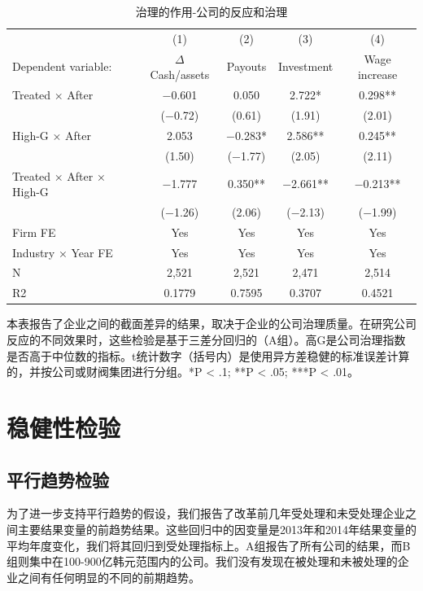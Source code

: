 \documentclass{article}
\begin{document}
\begin{table}[H]
\caption{治理的作用-公司的反应和治理}
\centering
\begin{tabular}{lcccc}
\toprule
                           & (1)          & (2)     & (3)        & (4)           \\ 
Dependent   variable:      & $\Delta$ Cash/assets & Payouts & Investment & Wage increase \\ \midrule
Treated ×   After          & −0.601       & 0.050   & 2.722*     & 0.298**       \\
                           & (−0.72)      & (0.61)  & (1.91)     & (2.01)        \\
High-G ×   After           & 2.053        & −0.283* & 2.586**    & 0.245**       \\
                           & (1.50)       & (−1.77) & (2.05)     & (2.11)        \\
Treated ×   After × High-G & −1.777       & 0.350** & −2.661**   & −0.213**      \\
                           & (−1.26)      & (2.06)  & (−2.13)    & (−1.99)       \\
Firm FE                    & Yes      & Yes  & Yes  & Yes      \\
Industry ×   Year FE       & Yes     &  Yes    & Yes      &  Yes         \\
N                          & 2,521        & 2,521   & 2,471      & 2,514         \\
R2                         & 0.1779       & 0.7595  & 0.3707     & 0.4521        \\ \bottomrule
\end{tabular}
\begin{tablenotes}
\footnotesize
    \item 本表报告了企业之间的截面差异的结果，取决于企业的公司治理质量。在研究公司反应的不同效果时，这些检验是基于三差分回归的（A组）。高G是公司治理指数是否高于中位数的指标。t统计数字（括号内）是使用异方差稳健的标准误差计算的，并按公司或财阀集团进行分组。*P < .1; **P < .05; ***P < .01。
\end{tablenotes}
\end{table}


\section{稳健性检验}
\subsection{平行趋势检验}
为了进一步支持平行趋势的假设，我们报告了改革前几年受处理和未受处理企业之间主要结果变量的前趋势结果。这些回归中的因变量是2013年和2014年结果变量的平均年度变化，我们将其回归到受处理指标上。A组报告了所有公司的结果，而B组则集中在100-900亿韩元范围内的公司。我们没有发现在被处理和未被处理的企业之间有任何明显的不同的前期趋势。
\end{document}
